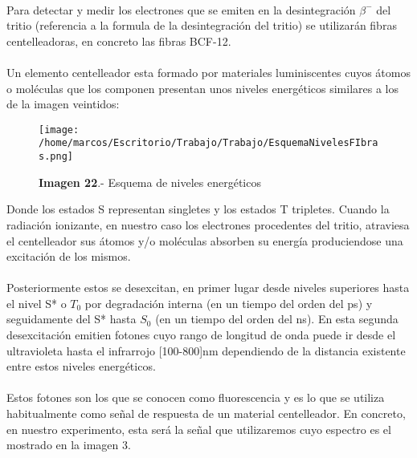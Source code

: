 \paragraph {}
Para detectar y medir los electrones que se emiten en la desintegración $\beta^-$ del tritio (referencia a la formula de la desintegración del tritio) se utilizarán fibras centelleadoras, en concreto las fibras BCF-12. 

\paragraph {}
Un elemento centelleador esta formado por materiales luminiscentes cuyos átomos o moléculas que los componen presentan unos niveles energéticos similares a los de la imagen veintidos:

\begin{figure}[hbtp]
\centering
\texttt{[image: /home/marcos/Escritorio/Trabajo/Trabajo/EsquemaNivelesFIbras.png]}
\caption{\textbf{Imagen 22}.- Esquema de niveles energéticos}
\end{figure}

Donde los estados S representan singletes y los estados T tripletes. Cuando la radiación ionizante, en nuestro caso los electrones procedentes del tritio, atraviesa el centelleador sus átomos y/o moléculas absorben su energía produciendose una excitación de los mismos. 

\paragraph {}
Posteriormente estos se desexcitan, en primer lugar desde niveles superiores hasta el nivel S* o $T_0$ por degradación interna (en un tiempo del orden del ps) y seguidamente del S* hasta $S_0$ (en un tiempo del orden del ns). En esta segunda desexcitación emitien fotones cuyo rango de longitud de onda puede ir desde el ultravioleta hasta el infrarrojo [100-800]nm dependiendo de la distancia existente entre estos niveles energéticos. 

\paragraph {}
Estos fotones son los que se conocen como fluorescencia y es lo que se utiliza habitualmente como señal de respuesta de un material centelleador. En concreto, en nuestro experimento, esta será la señal que utilizaremos cuyo espectro es el mostrado en la imagen 3.

